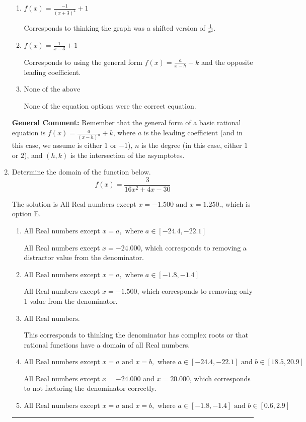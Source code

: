 \documentclass{extbook}[14pt]
\newcommand{\litem}[1]{\item #1

\rule{\textwidth}{0.4pt}}
\begin{document}
\begin{enumerate}
{\begin{enumerate}[label=\Alph*.]
The $x$-value of the equation does not match the graph.
\item \( f(x) = \frac{-1}{(x + 3)^2} + 1 \)

Corresponds to thinking the graph was a shifted version of $\frac{1}{x^2}$.
\item \( f(x) = \frac{1}{x - 3} + 1 \)

Corresponds to using the general form $f(x) = \frac{a}{x-h}+k$ and the opposite leading coefficient.
\item \( \text{None of the above} \)

None of the equation options were the correct equation.
\end{enumerate}

\textbf{General Comment:} Remember that the general form of a basic rational equation is $ f(x) = \frac{a}{(x-h)^n} + k$, where $a$ is the leading coefficient (and in this case, we assume is either $1$ or $-1$), $n$ is the degree (in this case, either $1$ or $2$), and $(h, k)$ is the intersection of the asymptotes.
}
\litem{
Determine the domain of the function below.
\[ f(x) = \frac{3}{16x^{2} +4 x -30} \]

The solution is \( \text{All Real numbers except } x = -1.500 \text{ and } x = 1.250. \), which is option E.\begin{enumerate}[label=\Alph*.]
\item \( \text{All Real numbers except } x = a, \text{ where } a \in [-24.4, -22.1] \)

All Real numbers except $x = -24.000$, which corresponds to removing a distractor value from the denominator.
\item \( \text{All Real numbers except } x = a, \text{ where } a \in [-1.8, -1.4] \)

All Real numbers except $x = -1.500$, which corresponds to removing only 1 value from the denominator.
\item \( \text{All Real numbers.} \)

This corresponds to thinking the denominator has complex roots or that rational functions have a domain of all Real numbers.
\item \( \text{All Real numbers except } x = a \text{ and } x = b, \text{ where } a \in [-24.4, -22.1] \text{ and } b \in [18.5, 20.9] \)

All Real numbers except $x = -24.000$ and $x = 20.000$, which corresponds to not factoring the denominator correctly.
\item \( \text{All Real numbers except } x = a \text{ and } x = b, \text{ where } a \in [-1.8, -1.4] \text{ and } b \in [0.6, 2.9] \)


\end{enumerate}}
\end{enumerate}
\end{document}
